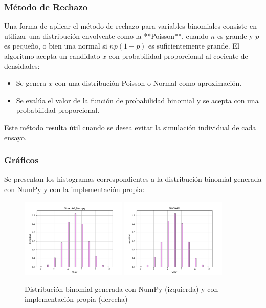 \documentclass{article}
\begin{document}
\subsubsection{Método de Rechazo}
Una forma de aplicar el método de rechazo para variables binomiales consiste en utilizar una distribución envolvente como la **Poisson**, cuando \( n \) es grande y \( p \) es pequeño, o bien una normal si \( np(1-p) \) es suficientemente grande. El algoritmo acepta un candidato $x$ con probabilidad proporcional al cociente de densidades:

\begin{itemize}
    \item Se genera $x$ con una distribución Poisson o Normal como aproximación.
    \item Se evalúa el valor de la función de probabilidad binomial y se acepta con una probabilidad proporcional.
\end{itemize}

Este método resulta útil cuando se desea evitar la simulación individual de cada ensayo.

\subsubsection{Gráficos}
Se presentan los histogramas correspondientes a la distribución binomial generada con NumPy y con la implementación propia:

\begin{figure}[H]
    \centering
    \includegraphics[width=0.45\textwidth]{Imagenes/Distribucion_Binomial_Numpy.png}
    \includegraphics[width=0.45\textwidth]{Imagenes/Distribucion_Binomial.png}
    \caption{Distribución binomial generada con NumPy (izquierda) y con implementación propia (derecha)}
    \label{fig:binomial}
\end{figure}
\end{document}
